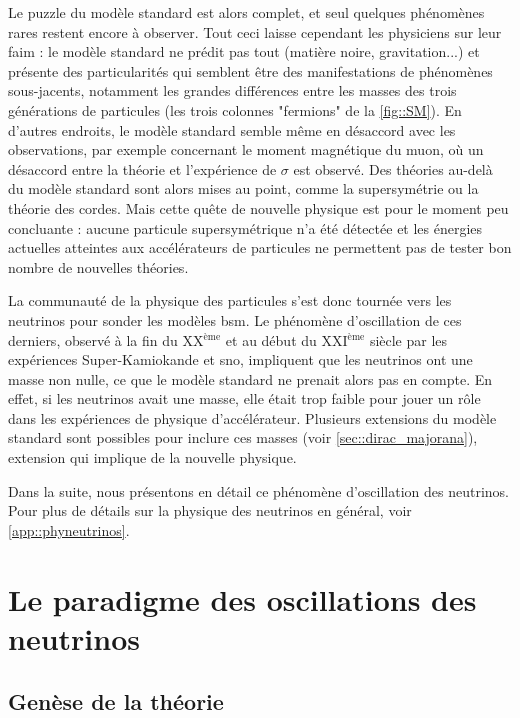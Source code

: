       Le puzzle du modèle standard est alors complet, et seul quelques phénomènes rares restent encore à observer. Tout ceci laisse cependant les physiciens sur leur faim : le modèle standard ne prédit pas tout (matière noire, gravitation...) et présente des particularités qui semblent être des manifestations de phénomènes sous-jacents, notamment les grandes différences entre les masses des trois générations de particules (les trois colonnes "fermions" de la \autoref{fig::SM}). En d'autres endroits, le modèle standard semble même en désaccord avec les observations, par exemple concernant le moment magnétique du muon, où un désaccord entre la théorie et l'expérience de $\sigma$ est observé\cite{pdg2018}. Des théories au-delà du modèle standard sont alors mises au point, comme la supersymétrie ou la théorie des cordes\cite{pdg2018}. Mais cette quête de nouvelle physique est pour le moment peu concluante : aucune particule supersymétrique n'a été détectée et les énergies actuelles atteintes aux accélérateurs de particules ne permettent pas de tester bon nombre de nouvelles théories.

      La communauté de la physique des particules s'est donc tournée vers les neutrinos pour sonder les modèles \gls{bsm}. Le phénomène d'oscillation de ces derniers, observé à la fin du XX$^{\text{ème}}$ et au début du XXI$^{\text{ème}}$ siècle par les expériences Super-Kamiokande\cite{Fukuda1998} et \gls{sno}\cite{Aharmim2013}, impliquent que les neutrinos ont une masse non nulle, ce que le modèle standard ne prenait alors pas en compte. En effet, si les neutrinos avait une masse, elle était trop faible pour jouer un rôle dans les expériences de physique d'accélérateur.  Plusieurs extensions du modèle standard sont possibles pour inclure ces masses (voir \autoref{sec::dirac_majorana}), extension qui implique de la nouvelle physique.

      Dans la suite, nous présentons en détail ce phénomène d'oscillation des neutrinos. Pour plus de détails sur la physique des neutrinos en général, voir \autoref{app::phyneutrinos}.

  \section{Le paradigme des oscillations des neutrinos}

    \subsection{Genèse de la théorie}

